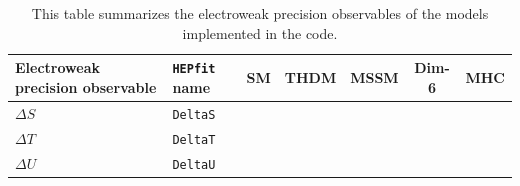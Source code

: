 \documentclass[aps,superscriptaddress,nofootinbib,floatfix,notitlepage]{revtex4-1}
\newcommand{\HEPfit}{\texttt{HEPfit}\xspace}
\begin{document}
\begin{table}
  \centering
  \begin{tabular}{|l|l|c|c|c|c|c|}
    \hline
    \textbf{Electroweak precision observable} & \textbf{\HEPfit name} & \textbf{SM} & \textbf{THDM} & \textbf{MSSM} & \textbf{Dim-6} & \textbf{MHC} \\
    \hline
	$\Delta S$ & \tt{DeltaS} & & \checkmark & & &\\
    \hline
	$\Delta T$ & \tt{DeltaT} & & \checkmark & & &\\
    \hline
	$\Delta U$ & \tt{DeltaU} & & \checkmark & & &\\
    \hline
  \end{tabular}
  \caption{This table summarizes the electroweak precision observables of the models
    implemented in the code.}
  \label{tab:summaryewpo}
\end{table}
\end{document}
